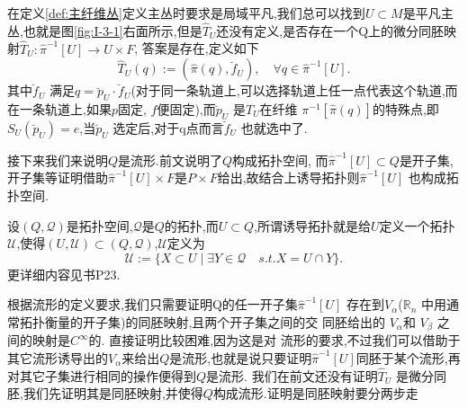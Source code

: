 \documentclass[../main.tex]{subfiles}
\begin{document}
在定义\ref{def:主纤维丛}定义主丛时要求是局域平凡,我们总可以找到$U\subset M$是平凡主丛,也就是图\ref{fig:I-3-1}右面所示,但是$\hat{T}_U$还没有定义,是否存在一个Q上的微分同胚映射$\hat{T}_U: \hat{\pi}^{-1}[U] \to U \times F$,
答案是存在,定义如下\[
  \hat{T}_U(q):= (\hat{\pi}(q),\breve{f}_U), \quad \forall q \in \hat{\pi}^{-1}[U] 
.\] 
其中$\breve{f}_U$ 满足$q = \breve{p}_U\cdot \breve{f}_U$(对于同一条轨道上,可以选择轨道上任一点代表这个轨道,而在一条轨道上,如果$p$固定, $f$便固定),而$\breve{p}_U$ 是$T_U$在纤维 $\pi^{-1}[\hat{\pi}(q)]$的特殊点,即$S_U(\breve{p}_U) = e$,当$\breve{p}_U$ 选定后,对于q点而言$\breve{f}_U$ 也就选中了.

接下来我们来说明$Q$是流形.前文说明了$Q$构成拓扑空间, 而$\hat{\pi}^{-1}[U]\subset Q$是开子集,开子集等证明借助$\hat{\pi}^{-1}[U]\times F$是$P\times F$给出,故结合上诱导拓扑则$\hat{\pi}^{-1}[U]$ 也构成拓扑空间.
\begin{note}
 设$(Q,\mathscr{Q})$是拓扑空间,$\mathscr{Q}$是$Q$的拓扑,而$U\subset Q$,所谓诱导拓扑就是给$U$定义一个拓扑 $\mathscr{U}$,使得$(U,\mathscr{U})\subset (Q,\mathscr{Q})$,$\mathscr{U}$定义为
 \[
   \mathscr{U}:=\{X \subset U \mid \exists Y \in \mathscr{Q}\quad s.t. X = U \cap Y\} 
 .\] 
 更详细内容见书P23.
\end{note}
根据流形的定义要求,我们只需要证明Q的任一开子集$\hat{\pi}^{-1}[U]$ 存在到$V_\alpha$($\mathbb{R}_n$ 中用通常拓扑衡量的开子集)的同胚映射,且两个开子集之间的交 同胚给出的 $V_\alpha$和 $V_\beta$ 之间的映射是$C^\infty$的.
直接证明比较困难,因为这是对 流形的要求,不过我们可以借助于其它流形诱导出的$V_\alpha$来给出$Q$是流形,也就是说只要证明$\hat{\pi}^{-1}[U]$同胚于某个流形,再对其它子集进行相同的操作便得到$Q$是流形.
我们在前文还没有证明$\hat{T}_U$ 是微分同胚,我们先证明其是同胚映射,并使得$Q$构成流形.证明是同胚映射要分两步走
\end{document}
